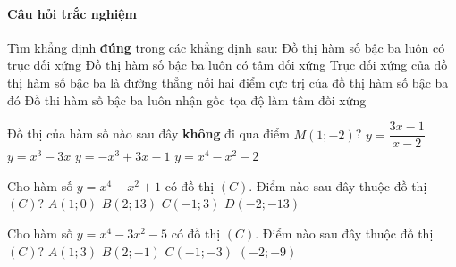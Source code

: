\paragraph{Câu hỏi trắc nghiệm}
\begin{ex}%
	Tìm khẳng định \textbf{đúng} trong các khẳng định sau: 
	\choice
	{Đồ thị hàm số bậc ba luôn có trục đối xứng}
	{\True Đồ thị hàm số bậc ba luôn có tâm đối xứng}
	{Trục đối xứng của đồ thị hàm số bậc ba là đường thẳng nối hai điểm cực trị của đồ thị hàm số bậc ba đó}
	{Đồ thi hàm số bậc ba luôn nhận gốc tọa độ làm tâm đối xứng}
\end{ex}
\begin{ex}%
	Đồ thị của hàm số nào sau đây \textbf{không} đi qua điểm $M(1;-2)$?
	\choice
	{$y=\dfrac{3x-1}{x-2}$}
	{$y=x^3-3x$}
	{\True $y=-x^3+3x-1$}
	{$y=x^4-x^2-2$}
\end{ex}
\begin{ex}%
	Cho hàm số $y=x^4-x^2+1$ có đồ thị $(C)$. Điểm nào sau đây thuộc đồ thị $(C)$?
	\choice
	{$A(1;0)$}
	{\True $B(2;13)$}
	{$C(-1;3)$}
	{$D(-2;-13)$}
\end{ex}
\begin{ex}%
	Cho hàm số $y=x^4-3x^2-5$ có đồ thị $(C)$. Điểm nào sau đây thuộc đồ thị $(C)$?
	\choice
	{$A(1;3)$}
	{\True $B(2;-1)$}
	{$C(-1;-3)$}
	{$(-2;-9)$}
\end{ex}
